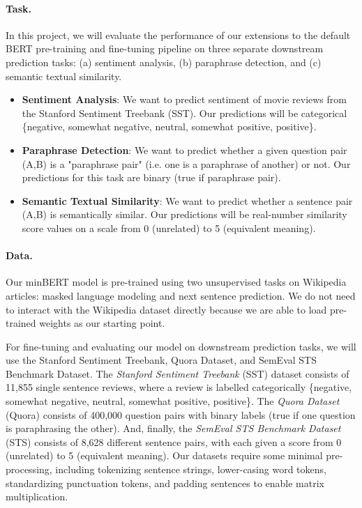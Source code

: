 \documentclass{article}
\begin{document}
\paragraph{Task.} 
In this project, we will evaluate the performance of our extensions to the default BERT pre-training and fine-tuning pipeline on three separate downstream prediction tasks: (a) sentiment analysis, (b) paraphrase detection, and (c) semantic textual similarity.

\begin{itemize}
    \item \textbf{Sentiment Analysis}: We want to predict sentiment of movie reviews from the Stanford Sentiment Treebank (SST). Our predictions will be categorical \{negative, somewhat negative, neutral, somewhat positive, positive\}.
    
    \item \textbf{Paraphrase Detection}: We want to predict whether a given question pair (A,B) is a "paraphrase pair" (i.e. one is a paraphrase of another) or not. Our predictions for this task are binary (true if paraphrase pair).
    
    \item \textbf{Semantic Textual Similarity}: We want to predict whether a sentence pair (A,B) is semantically similar. Our predictions will be real-number similarity score values on a scale from 0 (unrelated) to 5 (equivalent meaning).
\end{itemize}


\paragraph{Data.}
Our minBERT model is pre-trained using two unsupervised tasks on Wikipedia articles: masked language modeling and next sentence prediction. We do not need to interact with the Wikipedia dataset directly because we are able to load pre-trained weights as our starting point.

For fine-tuning and evaluating our model on downstream prediction tasks, we will use the Stanford Sentiment Treebank, Quora Dataset, and SemEval STS Benchmark Dataset. The \emph{Stanford Sentiment Treebank} (SST) dataset consists of 11,855 single sentence reviews, where a review is labelled categorically \{negative, somewhat negative, neutral, somewhat positive, positive\}. The \emph{Quora Dataset} (Quora) consists of 400,000 question pairs with binary labels (true if one question is paraphrasing the other). And, finally, the \emph{SemEval STS Benchmark Dataset} (STS) consists of 8,628 different sentence pairs, with each given a score from 0 (unrelated) to 5 (equivalent meaning). Our datasets require some minimal pre-processing, including tokenizing sentence strings, lower-casing word tokens, standardizing punctuation tokens, and padding sentences to enable matrix multiplication.
\end{document}
